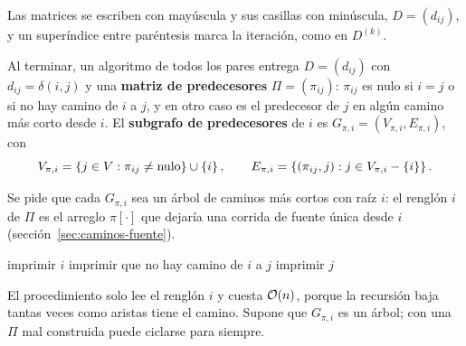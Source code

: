 \documentclass[11pt,letterpaper]{article}
\begin{document}
Las matrices se escriben con mayúscula y sus casillas con minúscula,
$D = (d_{ij})$, y un superíndice entre paréntesis marca la iteración,
como en $D^{(k)}$.

\begin{definicion}
  \label{def:predecesores-pares}
  Al terminar, un algoritmo de todos los pares entrega $D = (d_{ij})$
  con $d_{ij} = \delta(i, j)$ y una \textbf{matriz de predecesores}
  $\Pi = (\pi_{ij})$: $\pi_{ij}$ es nulo si $i = j$ o si no hay camino
  de $i$ a $j$, y en otro caso es el predecesor de $j$ en algún camino
  más corto desde $i$. El \textbf{subgrafo de predecesores} de $i$ es
  $G_{\pi,i} = (V_{\pi,i}, E_{\pi,i})$, con
  \[
    V_{\pi,i} = \left\{ j \in V : \pi_{ij} \neq \text{nulo} \right\} \cup \left\{ i \right\},
    \qquad
    E_{\pi,i} = \left\{ (\pi_{ij}, j) : j \in V_{\pi,i} - \left\{ i \right\} \right\} .
  \]
\end{definicion}

Se pide que cada $G_{\pi,i}$ sea un árbol de caminos más cortos con
raíz $i$: el renglón $i$ de $\Pi$ es el arreglo $\pi[\cdot]$ que
dejaría una corrida de fuente única desde $i$
(sección~\ref{sec:caminos-fuente}).

\begin{algorithm}[H]
\caption{\textsc{Imprimir-Camino-Pares}$(\Pi, i, j)$}
\label{alg:imprimir-pares}
\begin{algorithmic}[1]
    \State imprimir $i$
    \State imprimir que no hay camino de $i$ a $j$
  \Else
    \State {}
    \State imprimir $j$
  \EndIf
\EndProcedure
\end{algorithmic}
\end{algorithm}

El procedimiento solo lee el renglón $i$ y cuesta $\mathcal{O}\!\left(n\right)$, porque la
recursión baja tantas veces como aristas tiene el camino. Supone que
$G_{\pi,i}$ es un árbol; con una $\Pi$ mal construida puede ciclarse
para siempre.
\end{document}

